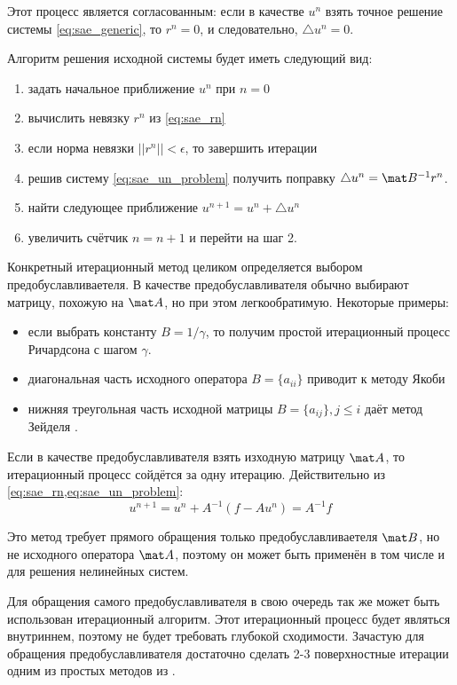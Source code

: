 Этот процесс является согласованным: если в качестве $u^n$ взять точное решение системы \cref{eq:sae_generic},
то $r^n = 0$, и следовательно, $\triangle u^n = 0$.

Алгоритм решения исходной системы будет иметь следующий вид:
\begin{enumerate}
\item задать начальное приближение $u^n$ при $n=0$
\item вычислить невязку $r^n$ из \cref{eq:sae_rn}
\item если норма невязки $||r^n|| < \epsilon$, то завершить итерации
\item решив систему \cref{eq:sae_un_problem} получить поправку $\triangle u^n = \mat B^{-1} r^n$.
\item найти следующее приближение $u^{n+1} = u^{n} + \triangle u^{n}$
\item увеличить счётчик $n = n + 1$ и перейти на шаг 2.
\end{enumerate}

Конкретный итерационный метод целиком определяется выбором предобуславливаетеля.
В качестве предобуславливателя обычно выбирают матрицу, похожую на $\mat A$, но при этом легкообратимую.
Некоторые примеры:
\begin{itemize}
\item если выбрать константу $B = 1/\gamma$, то получим
простой итерационный процесс Ричардсона с шагом $\gamma$.
\item диагональная часть исходного оператора $B = \{a_{ii}\}$ приводит к методу Якоби 
\item нижняя треугольная часть исходной матрицы $B = \{a_{ij}\}, j\leq i$ даёт метод Зейделя .
\end{itemize}

Если в качестве предобуславливателя взять изходную матрицу $\mat A$, 
то итерационный процесс сойдётся за одну итерацию. Действительно из \cref{eq:sae_rn,eq:sae_un_problem}:
\begin{equation*}
u^{n+1} = u^{n} + A^{-1}(f - A u^n) = A^{-1} f
\end{equation*}

Это метод требует прямого обращения только предобуславливаетеля $\mat B$, но не 
исходного оператора $\mat A$, поэтому он может быть применён в том числе и для решения нелинейных систем.

Для обращения самого предобуславливателя в свою очередь так же может
быть использован итерационный алгоритм. Этот итерационный процесс будет являться
внутриннем, поэтому не будет требовать глубокой сходимости.
Зачастую для обращения предобуславливателя достаточно сделать 2-3 поверхностные итерации
одним из простых методов из .

